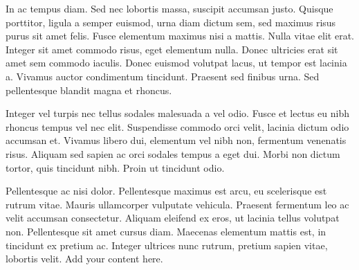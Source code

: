 In ac tempus diam. Sed nec lobortis massa, suscipit accumsan justo. Quisque porttitor, ligula a semper euismod, urna diam dictum sem, sed maximus risus purus sit amet felis. Fusce elementum maximus nisi a mattis. Nulla vitae elit erat. Integer sit amet commodo risus, eget elementum nulla. Donec ultricies erat sit amet sem commodo iaculis. Donec euismod volutpat lacus, ut tempor est lacinia a. Vivamus auctor condimentum tincidunt. Praesent sed finibus urna. Sed pellentesque blandit magna et rhoncus.

Integer vel turpis nec tellus sodales malesuada a vel odio. Fusce et lectus eu nibh rhoncus tempus vel nec elit. Suspendisse commodo orci velit, lacinia dictum odio accumsan et. Vivamus libero dui, elementum vel nibh non, fermentum venenatis risus. Aliquam sed sapien ac orci sodales tempus a eget dui. Morbi non dictum tortor, quis tincidunt nibh. Proin ut tincidunt odio.

Pellentesque ac nisi dolor. Pellentesque maximus est arcu, eu scelerisque est rutrum vitae. Mauris ullamcorper vulputate vehicula. Praesent fermentum leo ac velit accumsan consectetur. Aliquam eleifend ex eros, ut lacinia tellus volutpat non. Pellentesque sit amet cursus diam. Maecenas elementum mattis est, in tincidunt ex pretium ac. Integer ultrices nunc rutrum, pretium sapien vitae, lobortis velit.
Add your content here.
